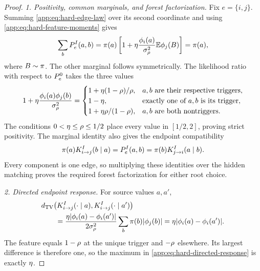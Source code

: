 \begin{proof}

\emph{1. Positivity, common marginals, and forest factorization.}
Fix \(e=\{i,j\}\).  Summing \eqref{app:eq:hard-edge-law} over its second
coordinate and using \eqref{app:eq:hard-feature-moments} gives
\[
 \sum_bP_{e}^{I}(a,b)
 =\pi(a)
  \left[1+
   \eta\frac{\phi_{i}(a)}{\sigma_\rho^2}
   \mathbb E\phi_{j}(B)
  \right]
 =\pi(a),
\]
where \(B\sim\pi\).  The other marginal follows symmetrically.
The likelihood ratio with respect to
\(P_{e}^{0}\) takes the three values
\begin{equation}
 1+\eta
   \frac{\phi_{i}(a)\phi_{j}(b)}
        {\sigma_\rho^2}
 =
 \begin{cases}
  1+\eta(1-\rho)/\rho,
    &a,b\text{ are their respective triggers},\\
  1-\eta,
    &\text{exactly one of }a,b\text{ is its trigger},\\
  1+\eta\rho/(1-\rho),
    &a,b\text{ are both nontriggers}.
 \end{cases}
 \label{app:eq:hard-likelihood-values}
\end{equation}
The conditions
\(0<\eta\le\rho\le1/2\) place every value in
\([1/2,2]\), proving strict positivity.  The marginal identity also gives
the endpoint compatibility
\[
 \pi(a)K_{i\to j}^{I}(b\mid a)
 =P_{e}^{I}(a,b)
 =\pi(b)K_{j\to i}^{I}(a\mid b).
\]
Every component is one edge, so multiplying these identities over the hidden
matching proves the required forest factorization for either root choice.


\emph{2. Directed endpoint response.}
For source values \(a,a'\),
\begin{align}
 &d_{\mathrm{TV}}\bigl(
   K_{i\to j}^{I}(\cdot\mid a),
   K_{i\to j}^{I}(\cdot\mid a')
  \bigr)\notag\\
 &\qquad=
 \frac{\eta
       |\phi_{i}(a)-\phi_{i}(a')|}
      {2\sigma_\rho^2}
 \sum_b\pi(b)|\phi_{j}(b)|
 =\eta
  |\phi_{i}(a)-\phi_{i}(a')|.
 \label{app:eq:hard-directed-response}
\end{align}
The feature equals \(1-\rho\) at the unique trigger and
\(-\rho\) elsewhere.  Its largest difference is therefore one, so
the maximum in \eqref{app:eq:hard-directed-response} is exactly
\(\eta\).



\end{proof}
